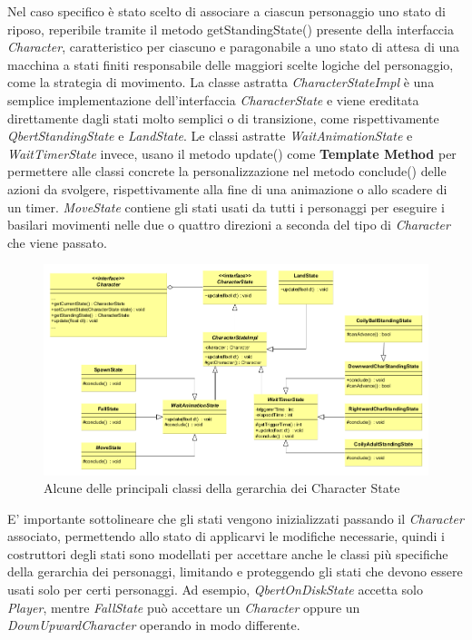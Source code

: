 \documentclass[a4paper,12pt, hidelinks]{report}
\begin{document}
Nel caso specifico  è stato scelto di associare a ciascun personaggio uno stato di riposo, reperibile tramite il metodo getStandingState() presente della interfaccia \emph{Character}, caratteristico per ciascuno e paragonabile a uno stato di attesa di una macchina a stati finiti responsabile delle maggiori scelte logiche del personaggio, come la strategia di movimento. La classe astratta \emph{CharacterStateImpl} è una semplice implementazione dell'interfaccia \emph{CharacterState} e viene ereditata direttamente dagli stati molto semplici o di transizione, come rispettivamente \emph{QbertStandingState} e \emph{LandState}. Le classi astratte \emph{WaitAnimationState} e \emph{WaitTimerState} invece, usano il metodo update() come \textbf{Template Method} per permettere alle classi concrete la personalizzazione nel metodo conclude() delle azioni da svolgere, rispettivamente alla fine di una animazione o allo scadere di un timer. \emph{MoveState} contiene gli stati usati da tutti i personaggi per eseguire i basilari movimenti nelle due o quattro direzioni a seconda del tipo di \emph{Character} che viene passato.

\begin{figure}[H]
\centering{}
\includegraphics[width=\linewidth]{img/CharacterStates}
\caption{Alcune delle principali classi della gerarchia dei Character State}
\label{img:CharacterStates}
\end{figure}

E' importante sottolineare che gli stati vengono inizializzati passando il \emph{Character} associato, permettendo allo stato di applicarvi le modifiche necessarie, quindi i costruttori degli stati sono modellati per accettare anche le classi più specifiche della gerarchia dei personaggi, limitando e proteggendo gli stati che devono essere usati solo per certi personaggi. Ad esempio, \emph{QbertOnDiskState} accetta solo \emph{Player}, mentre \emph{FallState} può accettare un \emph{Character} oppure un \emph{DownUpwardCharacter} operando in modo differente.
\end{document}
